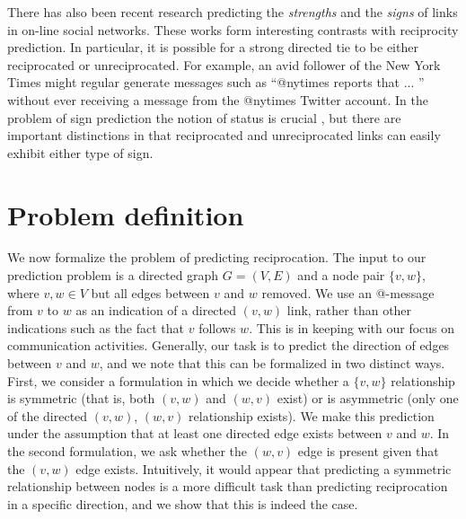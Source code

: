 \documentclass[conference]{IEEEtran}
\begin{document}
There has also been recent research predicting the 
{\em strengths} \cite{gilbert-tie-strength} and the 
{\em signs} \cite{leskovec-chi10} of links in on-line social networks.
These works form interesting contrasts with reciprocity prediction.
In particular, it is possible for a strong directed tie to be
either reciprocated or unreciprocated.  For example, an avid
follower of the New York Times might regular generate messages
such as ``@nytimes reports that ... '' without
ever receiving a message from the @nytimes Twitter account.
In the problem of sign prediction the
notion of status is crucial \cite{leskovec-chi10},
but there are important distinctions in that reciprocated and
unreciprocated links can easily exhibit either type of sign.

\section{Problem definition}

We now formalize the problem of predicting reciprocation.
The input to our prediction problem is a directed graph $G=(V,E)$ and a node pair $\{v,w\}$, where $v,w \in V$ but all edges between $v$ and $w$ removed. 
We use an @-message from $v$ to $w$ as an indication of a directed
$(v,w)$ link, rather than other indications such as the fact
that $v$ follows $w$.
This is in keeping with our focus 
on communication activities.
Generally, our task
is to predict the direction of edges between $v$ and $w$, and we note
that this can be formalized in two distinct ways.
First, we consider a formulation in which we decide whether a $\{v,w\}$ relationship is symmetric (that is, both $(v,w)$ and $(w,v)$ exist) or is asymmetric (only one of the directed $(v,w)$, $(w,v)$ relationship exists).
We make this prediction under the assumption that at least one directed edge exists between $v$ and $w$. 
In the second formulation, we ask whether the $(w,v)$ edge is present given that the 
$(v,w)$ edge exists.
Intuitively, it would appear that predicting a symmetric relationship
between nodes is a more difficult task than predicting reciprocation
in a specific direction, and we show that this is indeed the case.
\end{document}
